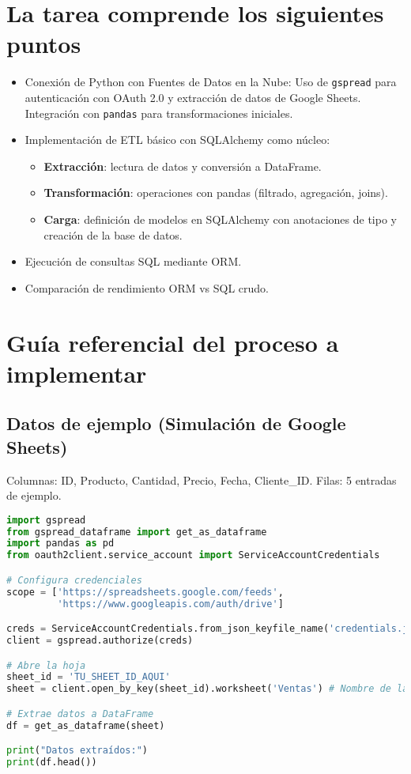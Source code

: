 \documentclass[12pt,a4paper]{article}
\begin{document}
\section*{La tarea comprende los siguientes puntos}
\begin{itemize}
  \item Conexión de Python con Fuentes de Datos en la Nube: Uso de \texttt{gspread} para autenticación con OAuth 2.0 y extracción de datos de Google Sheets. Integración con \texttt{pandas} para transformaciones iniciales.
  \item Implementación de ETL básico con SQLAlchemy como núcleo:
    \begin{itemize}
        \item \textbf{Extracción}: lectura de datos y conversión a DataFrame.
        \item \textbf{Transformación}: operaciones con pandas (filtrado, agregación, joins).
        \item \textbf{Carga}: definición de modelos en SQLAlchemy con anotaciones de tipo y creación de la base de datos.
    \end{itemize}
  \item Ejecución de consultas SQL mediante ORM.
  \item Comparación de rendimiento ORM vs SQL crudo.
\end{itemize}

\section*{Guía referencial del proceso a implementar}
\subsection*{Datos de ejemplo (Simulación de Google Sheets)}
Columnas: ID, Producto, Cantidad, Precio, Fecha, Cliente\_ID.  
Filas: 5 entradas de ejemplo.

\begin{lstlisting}[language=Python, caption={Conexión a Google Sheets con gspread}]
import gspread
from gspread_dataframe import get_as_dataframe
import pandas as pd
from oauth2client.service_account import ServiceAccountCredentials

# Configura credenciales
scope = ['https://spreadsheets.google.com/feeds',
         'https://www.googleapis.com/auth/drive']

creds = ServiceAccountCredentials.from_json_keyfile_name('credentials.json', scope)
client = gspread.authorize(creds)

# Abre la hoja
sheet_id = 'TU_SHEET_ID_AQUI'
sheet = client.open_by_key(sheet_id).worksheet('Ventas') # Nombre de la hoja

# Extrae datos a DataFrame
df = get_as_dataframe(sheet)

print("Datos extraídos:")
print(df.head())
\end{lstlisting}
\end{document}
